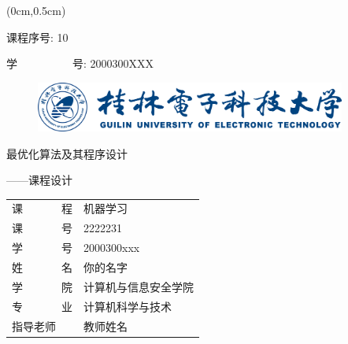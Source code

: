 


\begin{titlepage}

	\begin{textblock*}{5cm}(0cm,0.5cm) %
		
		\xiaosan 课程序号: 10
		
		\xiaosan 学~~~~~~~~~~号: 2000300XXX
	\end{textblock*}
	
	\vspace{1.5em}
	\begin{center}
		\begin{figure}[!ht]\vspace{-1em}
			\centering
 			\includegraphics[width=0.91\textwidth]{figures/桂电标志.pdf}
			\vspace{3em}\\
		\end{figure}
		
		
		\vspace{4em}
		\begin{center} {\erhao\hei 最优化算法及其程序设计
				
				——课程设计}\end{center}
		
		\vspace{1em}
		{\sanhao
			\begin{center} \renewcommand{\arraystretch}{1.7}
				\begin{tabular}{l@{：}l}
					
					课~~~~~~~程 & 机器学习\\
					课~~~~~~~号 & 2222231\\
					学~~~~~~~号 & 2000300xxx \\
					姓~~~~~~~名 & 你的名字 \\
					学~~~~~~~院 & 计算机与信息安全学院\\
					专~~~~~~~业 & 计算机科学与技术\\
					指导老师    & 教师姓名 \\
					

\end{tabular}
\end{center}}
\end{center}
\end{titlepage}

